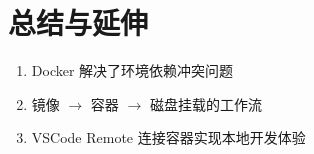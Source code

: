 \section{总结与延伸}
\begin{enumerate}
  \item Docker 解决了环境依赖冲突问题
  \item 镜像 $\to$ 容器 $\to$ 磁盘挂载的工作流
  \item VSCode Remote 连接容器实现本地开发体验
\end{enumerate}

